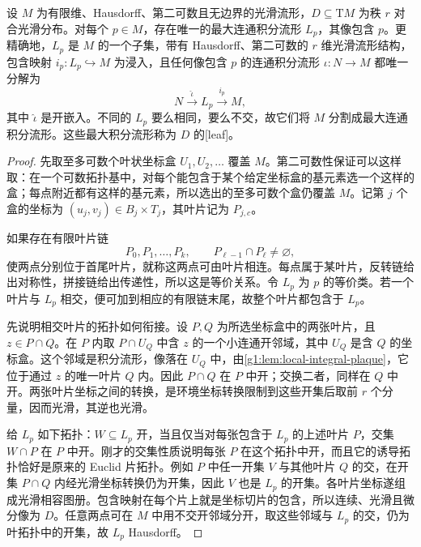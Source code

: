 \begin{theorem}\label{g1:thm:maximal-connected-leaf}
	设 \(M\) 为有限维、Hausdorff、第二可数且无边界的光滑流形，\(D\subseteq \mathrm{T}M\) 为秩 \(r\) 对合光滑分布。对每个 \(p\in M\)，存在唯一的最大连通积分流形 \(L_p\)，其像包含 \(p\)。更精确地，\(L_p\) 是 \(M\) 的一个子集，带有 Hausdorff、第二可数的 \(r\) 维光滑流形结构，包含映射 \(i_p:L_p\hookrightarrow M\) 为浸入，且任何像包含 \(p\) 的连通积分流形 \(\iota:N\to M\) 都唯一分解为
	\[
		N\xrightarrow{\ \widehat\iota\ }L_p\xrightarrow{\ i_p\ }M,
	\]
	其中 \(\widehat\iota\) 是开嵌入。不同的 \(L_p\) 要么相同，要么不交，故它们将 \(M\) 分割成最大连通积分流形。这些最大积分流形称为 \(D\) 的[leaf]。
\end{theorem}
\begin{proof}
	先取至多可数个叶状坐标盒 \(U_1,U_2,\ldots\) 覆盖 \(M\)。第二可数性保证可以这样取：在一个可数拓扑基中，对每个能包含于某个给定坐标盒的基元素选一个这样的盒；每点附近都有这样的基元素，所以选出的至多可数个盒仍覆盖 \(M\)。记第 \(j\) 个盒的坐标为 \((u_j,v_j)\in B_j\times T_j\)，其叶片记为 \(P_{j,c}\)。

	如果存在有限叶片链
	\[
		P_0,P_1,\ldots,P_k,\qquad
		P_{\ell-1}\cap P_\ell\ne\varnothing,
	\]
	使两点分别位于首尾叶片，就称这两点可由叶片相连。每点属于某叶片，反转链给出对称性，拼接链给出传递性，所以这是等价关系。令 \(L_p\) 为 \(p\) 的等价类。若一个叶片与 \(L_p\) 相交，便可加到相应的有限链末尾，故整个叶片都包含于 \(L_p\)。

	先说明相交叶片的拓扑如何衔接。设 \(P,Q\) 为所选坐标盒中的两张叶片，且 \(z\in P\cap Q\)。在 \(P\) 内取 \(P\cap U_Q\) 中含 \(z\) 的一个小连通开邻域，其中 \(U_Q\) 是含 \(Q\) 的坐标盒。这个邻域是积分流形，像落在 \(U_Q\) 中，由\cref{g1:lem:local-integral-plaque}，它位于通过 \(z\) 的唯一叶片 \(Q\) 内。因此 \(P\cap Q\) 在 \(P\) 中开；交换二者，同样在 \(Q\) 中开。两张叶片坐标之间的转换，是环境坐标转换限制到这些开集后取前 \(r\) 个分量，因而光滑，其逆也光滑。

	给 \(L_p\) 如下拓扑：\(W\subseteq L_p\) 开，当且仅当对每张包含于 \(L_p\) 的上述叶片 \(P\)，交集 \(W\cap P\) 在 \(P\) 中开。刚才的交集性质说明每张 \(P\) 在这个拓扑中开，而且它的诱导拓扑恰好是原来的 Euclid 片拓扑。例如 \(P\) 中任一开集 \(V\) 与其他叶片 \(Q\) 的交，在开集 \(P\cap Q\) 内经光滑坐标转换仍为开集，因此 \(V\) 也是 \(L_p\) 的开集。各叶片坐标遂组成光滑相容图册。包含映射在每个片上就是坐标切片的包含，所以连续、光滑且微分像为 \(D\)。任意两点可在 \(M\) 中用不交开邻域分开，取这些邻域与 \(L_p\) 的交，仍为叶拓扑中的开集，故 \(L_p\) Hausdorff。


\end{proof}
